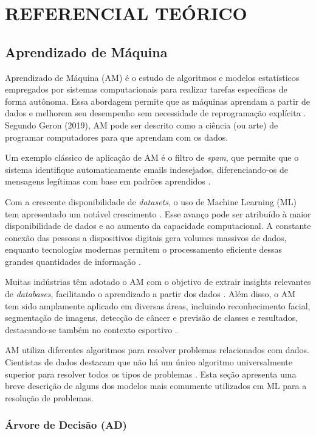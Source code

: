 \chapter{REFERENCIAL TEÓRICO}

\section{Aprendizado de Máquina}

Aprendizado de Máquina (AM) é o estudo de algoritmos e modelos estatísticos empregados por sistemas computacionais para realizar tarefas específicas de forma autônoma. Essa abordagem permite que as máquinas aprendam a partir de dados e melhorem seu desempenho sem necessidade de reprogramação explícita \cite{Mahesh2020}. Segundo Geron (2019), AM pode ser descrito como a ciência (ou arte) de programar computadores para que aprendam com os dados.

Um exemplo clássico de aplicação de AM é o filtro de \textit{spam}, que permite que o sistema identifique automaticamente emails indesejados, diferenciando-os de mensagens legítimas com base em padrões aprendidos \cite{Geron2019}. 

Com a crescente disponibilidade de \textit{datasets}, o uso de Machine Learning (ML) tem apresentado um notável crescimento \cite{Mahesh2020}. Esse avanço pode ser atribuído à maior disponibilidade de dados e ao aumento da capacidade computacional. A constante conexão das pessoas a dispositivos digitais gera volumes massivos de dados, enquanto tecnologias modernas permitem o processamento eficiente dessas grandes quantidades de informação \cite{AndrewNg}.

Muitas indústrias têm adotado o AM com o objetivo de extrair insights relevantes de \textit{databases}, facilitando o aprendizado a partir dos dados \cite{Mahesh2020}. Além disso, o AM tem sido amplamente aplicado em diversas áreas, incluindo reconhecimento facial, segmentação de imagens, detecção de câncer e previsão de classes e resultados, destacando-se também no contexto esportivo \cite{Almulla2023}.

AM utiliza diferentes algoritmos para resolver problemas relacionados com dados. Cientistas de dados destacam que não há um único algoritmo universalmente superior para resolver todos os tipos de problemas \cite{Mahesh2020}. Esta seção apresenta uma breve descrição de alguns dos modelos mais comumente utilizados em ML para a resolução de problemas.

\subsection{Árvore de Decisão (AD)}

